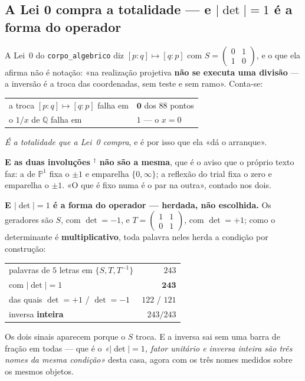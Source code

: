\documentclass[11pt,a4paper]{article}
\newcommand{\code}[1]{\texttt{\small #1}}
\newcommand{\dg}{^{\dagger}}
\newcommand{\Q}{\ensuremath{\mathbb{Q}}}
\begin{document}
\subsection*{A Lei 0 compra a totalidade --- e \texorpdfstring{$\lvert\det\rvert=1$}{|det|=1} é a forma do operador}

\noindent A Lei~0 do \code{corpo\_algebrico} diz $[p{:}q]\mapsto[q{:}p]$ com
$S=\left(\begin{smallmatrix}0&1\\1&0\end{smallmatrix}\right)$, e o que ela afirma não
é notação: «na realização projetiva \textbf{não se executa uma divisão} --- a inversão
é a troca das coordenadas, sem teste e sem ramo». Conta-se:
\begin{center}
\begin{tabular}{@{}ll@{}}
\toprule
a troca $[p{:}q]\mapsto[q{:}p]$ falha em & $\mathbf{0}$ dos $88$ pontos\\
o $1/x$ de $\Q$ falha em & $1$ --- o $x=0$\\
\bottomrule
\end{tabular}
\end{center}
\emph{É a totalidade que a Lei~0 compra}, e é por isso que ela «dá o arranque».

\medskip\noindent\textbf{E as duas involuções $\dg$ não são a mesma}, que é o aviso
que o próprio texto faz: a de $\mathbb{P}^1$ fixa o $\pm1$ e emparelha $\{0,\infty\}$;
a reflexão do trial fixa o zero e emparelha o $\pm1$. «O que é fixo numa é o par na
outra», contado nos dois.

\medskip\noindent\textbf{E $\lvert\det\rvert=1$ é a forma do operador --- herdada, não
escolhida.} Os geradores são $S$, com $\det=-1$, e $T=\left(\begin{smallmatrix}1&1\\0&1\end{smallmatrix}\right)$,
com $\det=+1$; como o determinante é \textbf{multiplicativo}, toda palavra neles herda
a condição por construção:
\begin{center}
\begin{tabular}{@{}lr@{}}
\toprule
palavras de $5$ letras em $\{S,T,T^{-1}\}$ & $243$\\
com $\lvert\det\rvert=1$ & $\mathbf{243}$\\
\quad das quais $\det=+1$ / $\det=-1$ & $122$ / $121$\\
inversa \textbf{inteira} & $243/243$\\
\bottomrule
\end{tabular}
\end{center}
\noindent Os dois sinais aparecem porque o $S$ troca. E a inversa sai sem uma barra de
fração em todas --- que é o \emph{«$\lvert\det\rvert=1$, fator unitário e inversa
inteira são três nomes da mesma condição»} desta casa, agora com os três nomes medidos
sobre os mesmos objetos.
\end{document}
